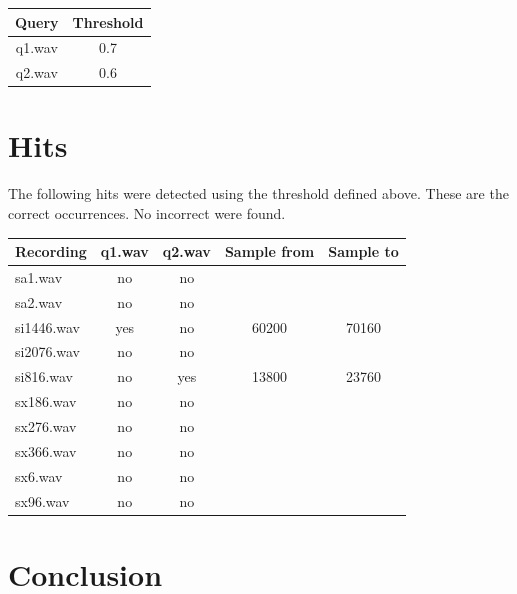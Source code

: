 \documentclass[11pt]{article}
\begin{document}
\begin{center}
\begin{tabular}{ |c|c| } 
 \hline
 Query & Threshold \\ 
 \hline
 q1.wav &  0.7 \\ 
 q2.wav & 0.6 \\ 
 \hline
\end{tabular}
\end{center}

\section{Hits}
\par
The following hits were detected using the threshold defined above. These are the correct occurrences. No incorrect were found.

\begin{center}
\begin{tabular}{ |l|c|c|c|c| }
\hline
Recording & q1.wav & q2.wav & Sample from & Sample to  \\
\hline
sa1.wav & no & no & & \\ 
sa2.wav & no & no & & \\ 
si1446.wav & yes & no & 60200 & 70160 \\ 
si2076.wav & no & no & & \\ 
si816.wav & no & yes & 13800 & 23760\\ 
sx186.wav & no & no & & \\ 
sx276.wav & no & no & &\\
sx366.wav & no & no & & \\
sx6.wav & no & no & & \\
sx96.wav & no & no & & \\
\hline
\end{tabular}
\end{center}

\section{Conclusion}
\par
\end{document}

